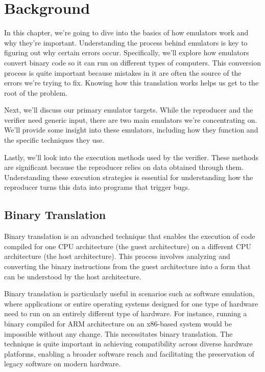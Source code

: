 
\chapter{Background}\label{chapter:background}
In this chapter, we're going to dive into the basics of how emulators work and why they're important.
Understanding the process behind emulators is key to figuring out why certain errors occur.
Specifically, we'll explore how emulators convert binary code so it can run on different types of computers.
This conversion process is quite important because mistakes in it are often the source of the errors we're trying to fix.
Knowing how this translation works helps us get to the root of the problem.

Next, we'll discuss our primary emulator targets.
While the reproducer and the verifier need generic input, there are two main emulators we're concentrating on.
We'll provide some insight into these emulators, including how they function and the specific techniques they use.

Lastly, we'll look into the execution methods used by the verifier.
These methods are significant because the reproducer relies on data obtained through them.
Understanding these execution strategies is essential for understanding how the reproducer turns this data into programs that trigger bugs.

\section{Binary Translation}
Binary translation is an advanched technique that enables the execution of code compiled for one CPU architecture (the guest architecture) on a different CPU architecture (the host architecture).
This process involves analyzing and converting the binary instructions from the guest architecture into a form that can be understood by the host architecture. 

Binary translation is particularly useful in scenarios such as software emulation, where applications or entire operating systems designed for one type of hardware need to run on an entirely different type of hardware.
For instance, running a binary compiled for ARM architecture on an x86-based system would be impossible without any change. This necessitates binary translation.
The technique is quite important in achieving compatibility across diverse hardware platforms, enabling a broader software reach and facilitating the preservation of legacy software on modern hardware.

